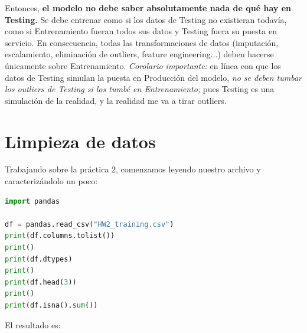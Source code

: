 \documentclass[spanish,oneside]{book} %
\begin{document}
Entonces, \textbf{el modelo no debe saber absolutamente nada de qué hay en Testing.} Se debe entrenar como si los datos de Testing no existieran todavía, como si Entrenamiento fueran todos sus datos y Testing fuera su puesta en servicio. En consecuencia, todas las transformaciones de datos (imputación, escalamiento, eliminación de outliers, feature engineering...) deben hacerse únicamente sobre Entrenamiento. \textit{Corolario importante:} en línea con que los datos de Testing simulan la puesta en Producción del modelo, \textit{no se deben tumbar los outliers de Testing si los tumbé en Entrenamiento;} pues Testing es una simulación de la realidad, y la realidad me va a tirar outliers.




\section {Limpieza de datos}

Trabajando sobre la práctica 2, comenzamos leyendo nuestro archivo y caracterizándolo un poco:

\begin{lstlisting}[language=Python]
import pandas

df = pandas.read_csv("HW2_training.csv")
print(df.columns.tolist())
print()
print(df.dtypes)
print()
print(df.head(3))
print()
print(df.isna().sum())
\end{lstlisting}

El resultado es:
\end{document}
